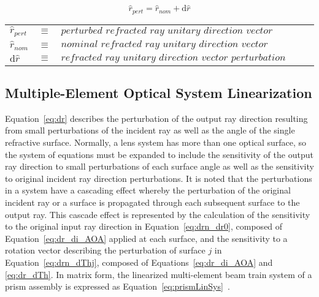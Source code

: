 \begin{table}[H]		%
\centering
\begin{equation}		%
\label{eq:perturbedRefractedRayDirection}
\hat{r}_{pert} = \hat{r}_{nom} + \textrm{d}\hat{r}
\end{equation}
\begin{tabular}{lll}
$\hat{r}_{pert}$ & $\equiv$ & $\textit{perturbed refracted ray unitary direction vector}$\\
$\hat{r}_{nom} $ & $\equiv$ & $\textit{nominal refracted ray unitary direction vector}$\\
$\textrm{d}\hat{r}$ & $\equiv$ & $\textit{refracted ray unitary direction vector perturbation vector}$
\end{tabular}
\end{table}

\subsection{Multiple-Element Optical System Linearization}
Equation~\eqref{eq:dr} describes the perturbation of the output ray direction resulting from small perturbations of the incident ray as well as the angle of the single refractive surface. Normally, a lens system has more than one optical surface, so the system of equations must be expanded to include the sensitivity of the output ray direction to small perturbations of each surface angle as well as the sensitivity to original incident ray direction perturbations. It is noted that the perturbations in a system have a cascading effect whereby the perturbation of the original incident ray or a surface is propagated through each subsequent surface to the output ray. This cascade effect is represented by the calculation of the sensitivity to the original input ray direction in Equation~\eqref{eq:drn_dr0}, composed of Equation~\eqref{eq:dr_di_AOA} applied at each surface, and the sensitivity to a rotation vector describing the perturbation of surface $j$ in Equation~\eqref{eq:drn_dThj}, composed of Equations~\eqref{eq:dr_di_AOA} and \eqref{eq:dr_dTh}. In matrix form, the linearized multi-element beam train system of a prism assembly is expressed as Equation~\eqref{eq:prismLinSys}~\cite{RedBreck}.

